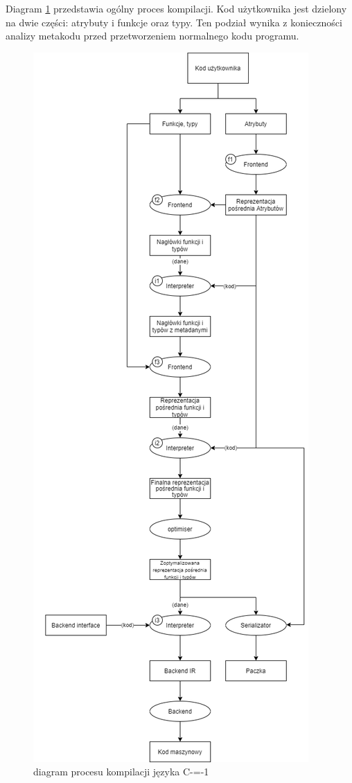 Diagram \ref{compilation_process_diagram} przedstawia ogólny proces kompilacji.
Kod użytkownika jest dzielony na dwie części: atrybuty i funkcje oraz typy.
Ten podział wynika z konieczności analizy metakodu przed przetworzeniem normalnego kodu programu.


\begin{figure}[]
    \caption{diagram procesu kompilacji języka C-=-1}
    \label{compilation_process_diagram}
    \includegraphics[width=\textwidth,height=\textheight,keepaspectratio]{img/compilation_process.png}
    \centering
\end{figure}

